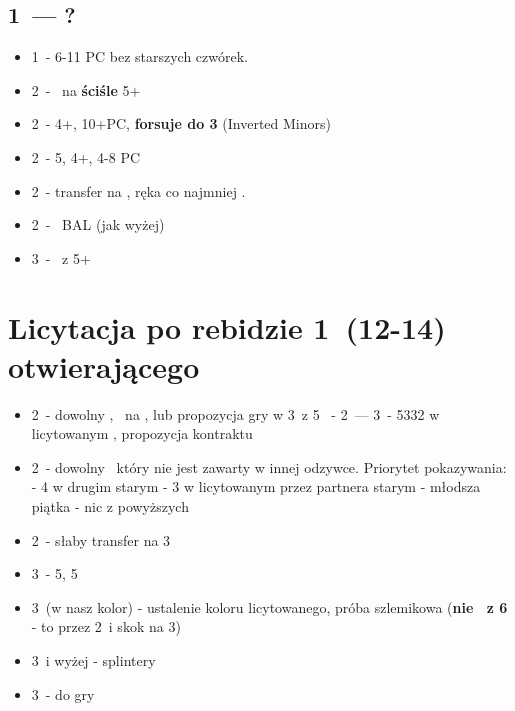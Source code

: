 \documentclass[12pt, a4paper]{article}
\begin{document}
\subsection{1\diams\ --- ?}
\begin{itemize}
    \item 1\nt\ - 6-11 PC bez starszych czwórek.
    \item 2\clubs\ - \gf\ na \textbf{ściśle} 5+\clubs
    \item 2\diams\ - 4+\diams, 10+PC, \textbf{forsuje do 3\diams} (Inverted Minors)
    \item 2\hearts\ - 5\spades, 4+\hearts, 4-8 PC
    \item 2\spades\ - transfer na \nt, ręka co najmniej \inv.
    \item 2\nt\ - \gf\ BAL (jak wyżej)
    \item 3\clubs\ - \mixed\ z 5+\clubs\
\end{itemize}

\pagebreak

\section{Licytacja po rebidzie 1\ntx\ (12-14) otwierającego}
\begin{itemize}
    \item 2\clubs\ - dowolny \inv, \soff\ na \diams, lub propozycja gry w 3\nt\ z 5\major
    \subitem 2\clubs\ - 2\diams\ --- 3\nt\ - 5332 w licytowanym \major, propozycja kontraktu
    \item 2\diams\ - dowolny \gf\, który nie jest zawarty w innej odzywce.
    Priorytet pokazywania:
    \subitem - 4 w drugim starym
    \subitem - 3 w licytowanym przez partnera starym
    \subitem - młodsza piątka
    \subitem - nic z powyższych
    \item 2\nt\ - słaby transfer na 3\clubs
    \item 3\minor\ - 5\major, 5\minor\ \gf\
    \item 3\hearts\ (w nasz kolor) - ustalenie koloru licytowanego, próba szlemikowa
        (\textbf{nie \inv\ z 6} - to przez 2\clubs\ i skok na 3\major)
    \item 3\spades\ i wyżej - splintery
    \item 3\nt\ - do gry
\end{itemize}

\pagebreak
\end{document}
